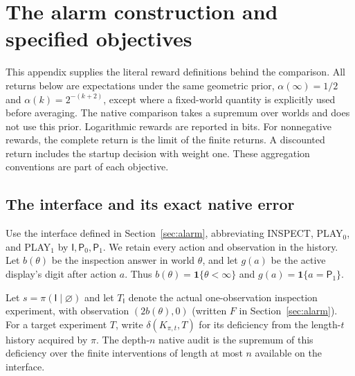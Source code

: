 \section{The alarm construction and specified objectives}
\label{app:alarm}

This appendix supplies the literal reward definitions behind the comparison.
All returns below are expectations under the same geometric prior,
$\alpha(\infty)=1/2$ and $\alpha(k)=2^{-(k+2)}$, except where a fixed-world
quantity is explicitly used before averaging. The native comparison takes a
supremum over worlds and does not use this prior. Logarithmic rewards are reported in bits.
For nonnegative rewards, the complete return is the limit of the finite returns. A discounted return includes the startup decision with weight one.
These aggregation conventions are part of each objective.

\subsection{The interface and its exact native error}
Use the interface defined in Section~\ref{sec:alarm}, abbreviating INSPECT,
PLAY$_0$, and PLAY$_1$ by $\mathsf I,\mathsf P_0,\mathsf P_1$. We retain every
action and observation in the history. Let $b(\theta)$ be the inspection answer
in world $\theta$, and let $g(a)$ be the active display's digit after action $a$.
Thus $b(\theta)=\mathbf1\{\theta<\infty\}$ and
$g(a)=\mathbf1\{a=\mathsf P_1\}$.

Let $s=\pi(\mathsf I\mid\varnothing)$ and let $T_{\mathsf I}$ denote the
actual one-observation inspection experiment, with observation $(2b(\theta),0)$
(written $F$ in Section~\ref{sec:alarm}).
For a target experiment $T$, write $\delta(K_{\pi,t},T)$ for its deficiency
from the length-$t$ history acquired by $\pi$. The depth-$n$ native audit is the
supremum of this deficiency over the finite interventions of length at most
$n$ available on the interface.

